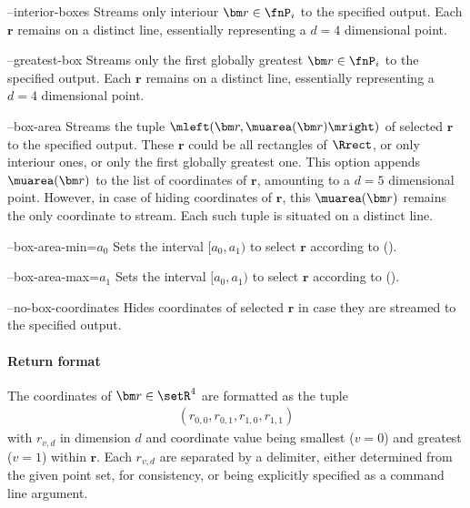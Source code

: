 \begin{procarg}{--interior-boxes}
  Streams only interiour $\bm r \in \fnP_i$ to the specified output. Each $\bm r$ remains on a distinct line, essentially representing a $d=4$ dimensional point.
\end{procarg}

\begin{procarg}{--greatest-box}
  Streams only the first globally greatest $\bm r \in \fnP_i$ to the specified output. Each $\bm r$ remains on a distinct line, essentially representing a $d=4$ dimensional point.
\end{procarg}

\begin{procarg}{--box-area}
  Streams the tuple $\mleft(\bm r, \muarea(\bm r)\mright)$ of selected $\bm r$ to the specified output. These $\bm r$ could be all rectangles of $\Rrect$, or only interiour ones, or only the first globally greatest one. This option appends $\muarea(\bm r)$ to the list of coordinates of $\bm r$, amounting to a $d=5$ dimensional point. However, in case of hiding coordinates of $\bm r$, this $\muarea(\bm r)$ remains the only coordinate to stream. Each such tuple is situated on a distinct line.
\end{procarg}

\begin{procarg}{--box-area-min=$a_0$}
  Sets the interval $[a_0, a_1)$ to select $\bm r$ according to ().
\end{procarg}

\begin{procarg}{--box-area-max=$a_1$}
  Sets the interval $[a_0, a_1)$ to select $\bm r$ according to ().
\end{procarg}

\begin{procarg}{--no-box-coordinates}
  Hides coordinates of selected $\bm r$ in case they are streamed to the specified output.
\end{procarg}

\procargsilent


\paragraph{Return format}

The coordinates of $\bm r \in \setR^4$ are formatted as the tuple
\begin{align*}
  (r_{0,0}, r_{0,1}, r_{1,0}, r_{1,1})
\end{align*}
with $r_{v,d}$ in dimension $d$ and coordinate value being smallest ($v=0$) and greatest ($v=1$) within $\bm r$. Each $r_{v,d}$ are separated by a delimiter, either determined from the given point set, for consistency, or being explicitly specified as a command line argument.

